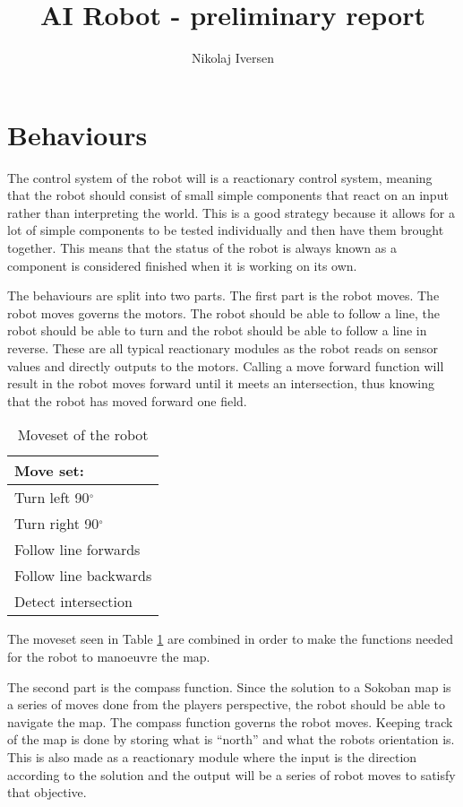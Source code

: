 \documentclass[a4paper,10pt]{article}
\title{AI Robot - preliminary report}
\author{Nikolaj Iversen}
\begin{document}
\maketitle

\section{Behaviours}
The control system of the robot will is a reactionary control system, meaning that the robot should consist of small  simple components that react on an input rather than interpreting the world.
This is a good strategy because it allows for a lot of simple components to be tested individually and then have them brought together.
This means that the status of the robot is always known as a component is considered finished when it is working on its own.

The behaviours are split into two parts.
The first part is the robot moves. 
The robot moves governs the motors. 
The robot should be able to follow a line, the robot should be able to turn and the robot should be able to follow a line in reverse.
These are all typical reactionary modules as the robot reads on sensor values and directly outputs to the motors.
Calling a move forward function will result in the robot moves forward until it meets an intersection, thus knowing that the robot has moved forward one field.

\begin{table}[h!]
\centering
 \begin{tabular}{|l|}
  \hline
  Move set: \\
  \hline
   Turn left 90$^{\circ}$ \\
   Turn right 90$^{\circ}$\\
   Follow line forwards\\
   Follow line backwards\\
   Detect intersection \\
   \hline
 \end{tabular}
\caption{Moveset of the robot}
\label{tab:movset}
\end{table}

The moveset seen in Table \ref{tab:movset} are combined in order to make the functions needed for the robot to manoeuvre the map.

The second part is the compass function.
Since the solution to a Sokoban map is a series of moves done from the players perspective, the robot should be able to navigate the map.
The compass function governs the robot moves.
Keeping track of the map is done by storing what is ``north'' and what the robots orientation is.
This is also made as a reactionary module where the input is the direction according to the solution and the output will be a series of robot moves to satisfy that objective.
\end{document}
